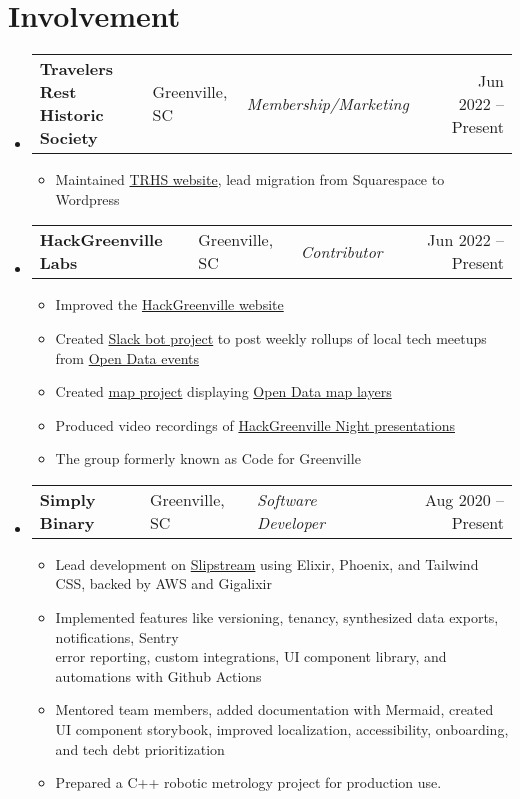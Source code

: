 \documentclass[11pt]{extarticle}
\makeatletter
\newcommand{\entry}[5]{
	\begin{tabularx}{\linewidth}{l@{, }l@{ – }lXr}
			\textbf{#1} & #2 & \lighttext \textit{#3} & & #4 – #5
	\end{tabularx}
	\vspace{-16pt}
}
\newcommand{\sectiontitle}[1]{
	\section*{\sectiontext #1}
	\vspace{-2pt}
}
\makeatother
\begin{document}
\sectiontitle{Involvement}
\begin{itemize}[leftmargin=1em]
	\item[]
	\entry{Travelers Rest Historic Society}{Greenville, SC}{Membership/Marketing}{Jun 2022}{Present}
	\begin{itemize}
		\item Maintained \href{https://travelersresthistoricalsociety.org}{TRHS
		website}, lead migration from Squarespace to Wordpress
	\end{itemize}

	\item[]
	\entry{HackGreenville Labs}{Greenville, SC}{Contributor}{Jun 2022}{Present}
	\begin{itemize}
		\item Improved the \href{https://hackgreenville.com/}{HackGreenville
			website}
		\item Created \href{https://github.com/hackgvl/slack-events-bot}{Slack bot
			project} to post weekly rollups of local tech meetups from
			\href{https://github.com/hackgvl/OpenData}{Open Data events}
		\item Created
			\href{https://github.com/hackgvl/open-map-data-multi-layers-demo}{map
			project} displaying
			\href{https://github.com/hackgvl/OpenData}{Open Data map layers}
		\item Produced video recordings of
		\href{https://www.youtube.com/playlist?list=PL8vFrjH8DfOHLH2hc_g87jLyiUWoupFtx}{HackGreenville
		Night presentations}
		\item The group formerly known as Code for Greenville
	\end{itemize}

	\item[]
	\entry{Simply Binary}{Greenville, SC}{Software Developer}{Aug 2020}{Present}
	\begin{itemize}
		\item Lead development on \href{https://www.goslipstream.app/}{Slipstream}
		using Elixir, Phoenix, and Tailwind CSS, backed by AWS and Gigalixir
		\item Implemented features like versioning, tenancy, synthesized data
		exports, notifications, Sentry \\
		error reporting, custom integrations, UI component library, and automations
		with Github Actions
		\item Mentored team members, added documentation with Mermaid, created UI
		component storybook, improved localization, accessibility, onboarding, and
		tech debt prioritization
		\item Prepared a C++ robotic metrology project for production use.
	\end{itemize}


\end{itemize}
\end{document}
